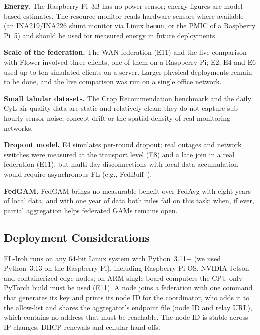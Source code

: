 \textbf{Energy.} The Raspberry Pi~3B has no power sensor; energy figures are model-based estimates. The resource monitor reads hardware sensors where available (an INA219/INA226 shunt monitor via Linux \texttt{hwmon}, or the PMIC of a Raspberry Pi~5) and should be used for measured energy in future deployments.

\textbf{Scale of the federation.} The WAN federation (E11) and the live comparison with Flower involved three clients, one of them on a Raspberry Pi; E2, E4 and E6 used up to ten simulated clients on a server. Larger physical deployments remain to be done, and the live comparison was run on a single office network.

\textbf{Small tabular datasets.} The Crop Recommendation benchmark and the daily CyL air-quality data are static and relatively clean; they do not capture sub-hourly sensor noise, concept drift or the spatial density of real monitoring networks.

\textbf{Dropout model.} E4 simulates per-round dropout; real outages and network switches were measured at the transport level (E8) and a late join in a real federation (E11), but multi-day disconnections with local data accumulation would require asynchronous FL (e.g., FedBuff~\cite{fedbuff2022}).

\textbf{FedGAM.} FedGAM brings no measurable benefit over FedAvg with eight years of local data, and with one year of data both rules fail on this task; when, if ever, partial aggregation helps federated GAMs remains open.

\subsection{Deployment Considerations}

FL-Iroh runs on any 64-bit Linux system with Python~3.11+ (we used Python~3.13 on the Raspberry Pi), including Raspberry Pi OS, NVIDIA Jetson and containerized edge nodes; on ARM single-board computers the CPU-only PyTorch build must be used (E11). A node joins a federation with one command that generates its key and prints its node ID for the coordinator, who adds it to the allow-list and shares the aggregator's endpoint file (node ID and relay URL), which contains no address that must be reachable. The node ID is stable across IP changes, DHCP renewals and cellular hand-offs.
